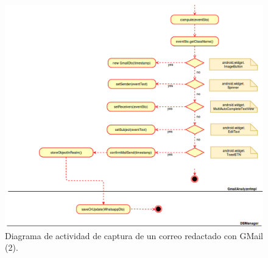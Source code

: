 \documentclass[12pt,a4paper,oneside]{book} %
\begin{document}
\begin{landscape}
\begin{figure}[htb]
	\begin{center}
		\includegraphics[width=1.1\textwidth]{pictures/activity/gmailActivityDiagram2.png} 
	  \caption[Diagrama actividad GMail (2)]{Diagrama de actividad de captura de un correo redactado con GMail (2).}
	  \label{fig:Diagrama actividad GMail (2)}
  	\end{center}
\end{figure}
\end{landscape}
\end{document}
